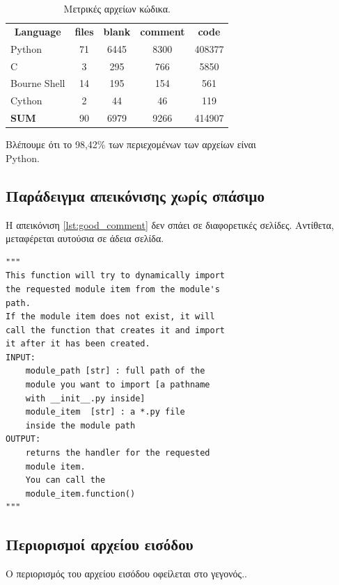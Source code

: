 \documentclass[12pt,a4paper]{report}%
\begin{document}
\begin{table}[!htbp]
\centering
\caption{Μετρικές αρχείων κώδικα.}
\label{tbl:code_files_metrics}
\begin{tabular}{|l|cccc|}
\hline
\multicolumn{1}{|c|}{\textbf{Language}} & \textbf{files} & \textbf{blank} & \textbf{comment} & \textbf{code} \\
Python                                  & 71             & 6445           & 8300             & 408377        \\
C                                       & 3              & 295            & 766              & 5850          \\
Bourne Shell                            & 14             & 195            & 154              & 561           \\
Cython                                  & 2              & 44             & 46               & 119           \\ \hline
\textbf{SUM}                            & 90             & 6979           & 9266             & 414907        \\ \hline
\end{tabular}
\end{table}

Βλέπουμε ότι το 98,42\% των περιεχομένων των αρχείων είναι\\
Python.

\section{Παράδειγμα απεικόνισης χωρίς σπάσιμο}
Η απεικόνιση \ref{lst:good_comment} δεν σπάει σε διαφορετικές σελίδες.
Αντίθετα, μεταφέρεται αυτούσια σε άδεια σελίδα.

\noindent\begin{minipage}{\linewidth}
\begin{lstlisting}[language=lang1,label=lst:good_comment,
caption=Διατήρηση απεικόνισης στην ίδια σελίδα.]
"""
This function will try to dynamically import
the requested module item from the module's
path.
If the module item does not exist, it will
call the function that creates it and import
it after it has been created.
INPUT:
    module_path [str] : full path of the
    module you want to import [a pathname
    with __init__.py inside]
    module_item  [str] : a *.py file
    inside the module path
OUTPUT:
    returns the handler for the requested
    module item.
    You can call the
    module_item.function()
"""
\end{lstlisting}
\end{minipage}

\begin{appendices}
\chapter{Περιορισμοί αρχείου εισόδου}
Ο περιορισμός του αρχείου εισόδου οφείλεται στο γεγονός..
\end{appendices}



{\footnotesize
}
\end{document}
